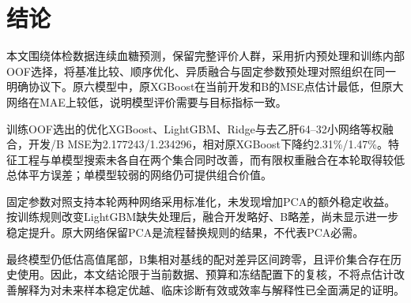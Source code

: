 \section{结论}\label{sec:conclusion}
本文围绕体检数据连续血糖预测，保留完整评价人群，采用折内预处理和训练内部OOF选择，将基准比较、顺序优化、异质融合与固定参数预处理对照组织在同一明确协议下。原六模型中，原XGBoost在当前开发和B的MSE点估计最低，但原大网络在MAE上较低，说明模型评价需要与目标指标一致。

训练OOF选出的优化XGBoost、LightGBM、Ridge与去乙肝64--32小网络等权融合，开发/B MSE为2.177243/1.234296，相对原XGBoost下降约2.31\%/1.47\%。特征工程与单模型搜索未各自在两个集合同时改善，而有限权重融合在本轮取得较低总体平方误差；单模型较弱的网络仍可提供组合价值。

固定参数对照支持本轮两种网络采用标准化，未发现增加PCA的额外稳定收益。按训练规则改变LightGBM缺失处理后，融合开发略好、B略差，尚未显示进一步稳定提升。原大网络保留PCA是流程替换规则的结果，不代表PCA必需。

最终模型仍低估高值尾部，B集相对基线的配对差异区间跨零，且评价集合存在历史使用。因此，本文结论限于当前数据、预算和冻结配置下的复核，不将点估计改善解释为对未来样本稳定优越、临床诊断有效或效率与解释性已全面满足的证明。

